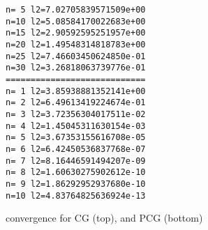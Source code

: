 \documentclass[10pt]{article}
\begin{document}
\begin{printout}
  \begin{verbatim}
n= 5 l2=7.02705839571509e+00
n=10 l2=5.08584170022683e+00
n=15 l2=2.90592595251957e+00
n=20 l2=1.49548314818783e+00
n=25 l2=7.46603450624850e-01
n=30 l2=3.26818063739776e-01  
============================
n= 1 l2=3.85938881352141e+00
n= 2 l2=6.49613419224674e-01
n= 3 l2=3.72356304017511e-02
n= 4 l2=1.45045311630154e-03
n= 5 l2=3.67353155616708e-05
n= 6 l2=6.42450536837768e-07
n= 7 l2=8.16446591494207e-09
n= 8 l2=1.60630275902612e-10
n= 9 l2=1.86292952937680e-10
n=10 l2=4.83764825636924e-13
  \end{verbatim}
  \caption{convergence for CG (top), and PCG (bottom)}
\end{printout}
\end{document}
